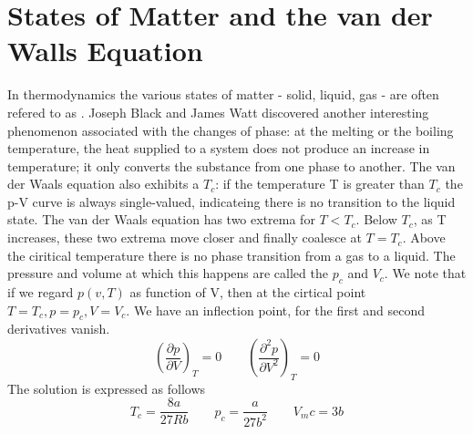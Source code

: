 \section{States of Matter and the van der Walls Equation}
In thermodynamics the various states of matter - solid, liquid, gas - are often refered to as . Joseph Black and James Watt 
discovered another interesting phenomenon associated with the changes of phase: at the melting or the boiling temperature, the heat supplied
to a system does not produce an increase in temperature; it only converts the substance from one phase to another. The van der Waals equation 
also exhibits a  $T_c$: if the temperature T is greater than $T_c$ the p-V curve is always single-valued,
indicateing there is no transition to the liquid state. The van der Waals equation has two extrema for $T<T_c$. Below $T_c$, as T increases,
these two extrema move closer and finally coalesce at $T=T_c$. Above the ciritical temperature there is no phase transition from a gas to a liquid.
The pressure and volume at which this happens are called the  $p_c$ and  $V_c$. We note that if
we regard $p(v,T)$ as function of V, then at the cirtical point $T=T_c,p=p_c,V=V_c$. We have an inflection point, for the first and second
derivatives vanish. 
\begin{equation}
\left(\frac{\partial p}{\partial V}\right)_T=0 \qquad \left(\frac{\partial^2 p}{\partial V^2}\right)_T=0
\end{equation}
The solution is expressed as follows
\begin{equation}
T_c=\frac{8a}{27Rb}\qquad p_c=\frac{a}{27b^2}\qquad V_mc=3b
\end{equation}